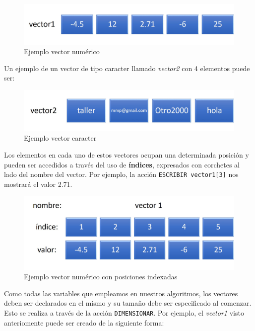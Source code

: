 \documentclass[
]{book}
\begin{document}
\begin{figure}

{\centering \includegraphics[width=0.8\linewidth]{images/10_vector1} 

}

\caption{Ejemplo vector numérico}\label{fig:vector1}
\end{figure}

Un ejemplo de un vector de tipo caracter llamado \emph{vector2} con 4 elementos puede ser:

\begin{figure}

{\centering \includegraphics[width=0.8\linewidth]{images/11_vector2} 

}

\caption{Ejemplo vector caracter}\label{fig:vector2}
\end{figure}

Los elementos en cada uno de estos vectores ocupan una determinada posición y pueden ser accedidos a través del uso de \textbf{índices}, expresados con corchetes al lado del nombre del vector. Por ejemplo, la acción \texttt{ESCRIBIR\ vector1{[}3{]}} nos mostrará el valor 2.71.

\begin{figure}

{\centering \includegraphics[width=0.8\linewidth]{images/12_vector1} 

}

\caption{Ejemplo vector numérico con posiciones indexadas}\label{fig:vector1bis}
\end{figure}

Como todas las variables que empleamos en nuestros algoritmos, los vectores deben ser declarados en el mismo y su tamaño debe ser especificado al comenzar. Esto se realiza a través de la acción \texttt{DIMENSIONAR}. Por ejemplo, el \emph{vector1} visto anteriomente puede ser creado de la siguiente forma:
\end{document}
